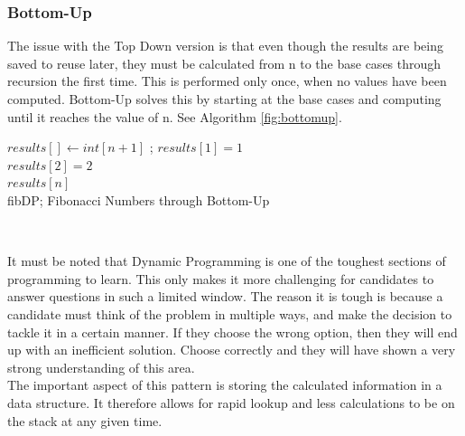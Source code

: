 \documentclass[conference]{IEEEtran}
\begin{document}
	\subsubsection{Bottom-Up}
	The issue with the Top Down version is that even though the results are being saved to reuse later, they must be calculated from n to the base cases through recursion the first time. This is performed only once, when no values have been computed.
	Bottom-Up solves this by starting at the base cases and computing until it reaches the value of n. See Algorithm \ref{fig:bottomup}.
\IncMargin{1em}
	\begin{algorithm}
	\LinesNumbered
		$results[] \leftarrow int[n+1]$ ; $results[1] = 1$ \\ $results[2] = 2$ \\
		\Return $results[n]$\\		
		\caption{fibDP; Fibonacci Numbers through Bottom-Up}
		\label{fig:bottomup}
	\end{algorithm}\DecMargin{1em}
	\\
\par It must be noted that Dynamic Programming is one of the toughest sections of programming to learn. This only makes it more challenging for candidates to answer questions in such a limited window. The reason it is tough is because a candidate must think of the problem in multiple ways, and make the decision to tackle it in a certain manner. If they choose the wrong option, then they will end up with an inefficient solution. Choose correctly and they will have shown a very strong understanding of this area.\\

 The important aspect of this pattern is storing the calculated information in a data structure. It therefore allows for rapid lookup and less calculations to be on the stack at any given time. 
\end{document}
